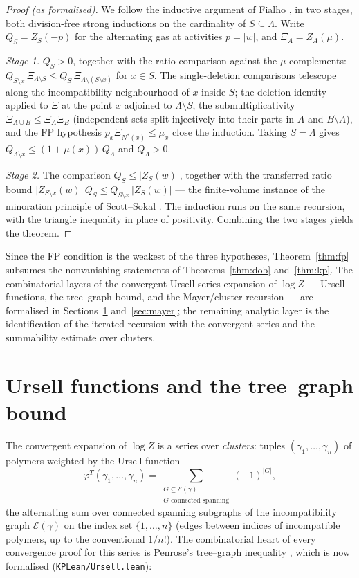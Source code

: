 \documentclass[11pt]{amsart}
\begin{document}
\begin{proof}[Proof (as formalised)]
We follow the inductive argument of Fialho \cite{Fia20}, in two stages,
both division-free strong inductions on the cardinality of
$S \subseteq \Lambda$. Write $Q_S = Z_S(-p)$ for the alternating gas at
activities $p = \lvert w \rvert$, and $\Xi_A = Z_A(\mu)$.

\emph{Stage 1.} $Q_S > 0$, together with the ratio comparison against
the $\mu$-complements:
$Q_{S \setminus x} \, \Xi_{\Lambda \setminus S} \le
Q_S \, \Xi_{\Lambda \setminus (S \setminus x)}$ for $x \in S$.
The single-deletion comparisons telescope along the incompatibility
neighbourhood of $x$ inside $S$; the deletion identity applied to
$\Xi$ at the point $x$ adjoined to $\Lambda \setminus S$, the
submultiplicativity $\Xi_{A \cup B} \le \Xi_A \Xi_B$ (independent sets
split injectively into their parts in $A$ and $B \setminus A$), and the
FP hypothesis $p_x \Xi_{N^*(x)} \le \mu_x$ close the induction. Taking
$S = \Lambda$ gives $Q_{\Lambda \setminus x} \le (1 + \mu(x))\,
Q_\Lambda$ and $Q_\Lambda > 0$.

\emph{Stage 2.} The comparison $Q_S \le \lvert Z_S(w) \rvert$, together
with the transferred ratio bound
$\lvert Z_{S \setminus x}(w)\rvert \, Q_S \le
Q_{S \setminus x} \, \lvert Z_S(w)\rvert$ — the finite-volume instance
of the minoration principle of Scott--Sokal \cite[Thm.~2.10]{SS05}. The
induction runs on the same recursion, with the triangle inequality in
place of positivity. Combining the two stages yields the theorem.
\end{proof}

Since the FP condition is the weakest of the three hypotheses,
Theorem~\ref{thm:fp} subsumes the nonvanishing statements of
Theorems~\ref{thm:dob} and~\ref{thm:kp}. The combinatorial layers of the
convergent Ursell-series expansion of $\log Z$ — Ursell functions, the
tree--graph bound, and the Mayer/cluster recursion — are formalised in
Sections~\ref{sec:ursell} and~\ref{sec:mayer}; the remaining analytic
layer is the identification of the iterated recursion with the
convergent series and the summability estimate over clusters.

\section{Ursell functions and the tree--graph bound}\label{sec:ursell}

The convergent expansion of $\log Z$ is a series over \emph{clusters}:
tuples $(\gamma_1, \dots, \gamma_n)$ of polymers weighted by the Ursell
function
\[
  \varphi^{T}(\gamma_1, \dots, \gamma_n)
  = \sum_{\substack{G \subseteq \mathcal{E}(\gamma) \\ G \text{ connected
  spanning}}} (-1)^{\lvert G \rvert},
\]
the alternating sum over connected spanning subgraphs of the
incompatibility graph $\mathcal{E}(\gamma)$ on the index set
$\{1, \dots, n\}$ (edges between indices of incompatible polymers, up to
the conventional $1/n!$). The combinatorial heart of every convergence
proof for this series is Penrose's tree--graph inequality \cite{Pen67},
which is now formalised (\texttt{KPLean/Ursell.lean}):
\end{document}
